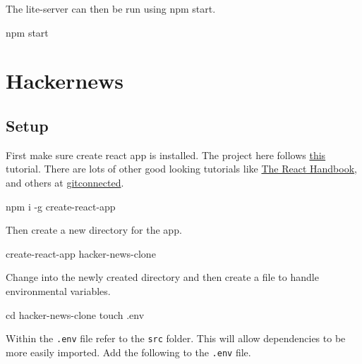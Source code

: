 \documentclass[]{book}
\newenvironment{Shaded}{\begin{snugshade}}{\end{snugshade}}
\newcommand{\FunctionTok}[1]{\textcolor[rgb]{0.00,0.00,0.00}{#1}}
\newcommand{\BuiltInTok}[1]{#1}
\newcommand{\ExtensionTok}[1]{#1}
\newcommand{\NormalTok}[1]{#1}
\begin{document}
The lite-server can then be run using npm start.

\begin{Shaded}
\begin{Highlighting}[]
\ExtensionTok{npm}\NormalTok{ start}
\end{Highlighting}
\end{Shaded}

\chapter{Hackernews}\label{hackernews}

\section{Setup}\label{setup-1}

First make sure create react app is installed. The project here follows
\href{https://www.youtube.com/watch?v=oGB_VPrld0U\&list=PLTTC1K14KAxHj6AftnRUD28SQaoVauvl3}{this}
tutorial. There are lots of other good looking tutorials like
\href{https://www.freecodecamp.org/news/the-react-handbook-b71c27b0a795/}{The
React Handbook}, and others at
\href{https://gitconnected.com/learn/react}{gitconnected}.

\begin{Shaded}
\begin{Highlighting}[]
\ExtensionTok{npm}\NormalTok{ i -g create-react-app}
\end{Highlighting}
\end{Shaded}

Then create a new directory for the app.

\begin{Shaded}
\begin{Highlighting}[]
\ExtensionTok{create-react-app}\NormalTok{ hacker-news-clone}
\end{Highlighting}
\end{Shaded}

Change into the newly created directory and then create a file to handle
environmental variables.

\begin{Shaded}
\begin{Highlighting}[]
\BuiltInTok{cd}\NormalTok{ hacker-news-clone}
\FunctionTok{touch}\NormalTok{ .env}
\end{Highlighting}
\end{Shaded}

Within the \texttt{.env} file refer to the \texttt{src} folder. This
will allow dependencies to be more easily imported. Add the following to
the \texttt{.env} file.
\end{document}
